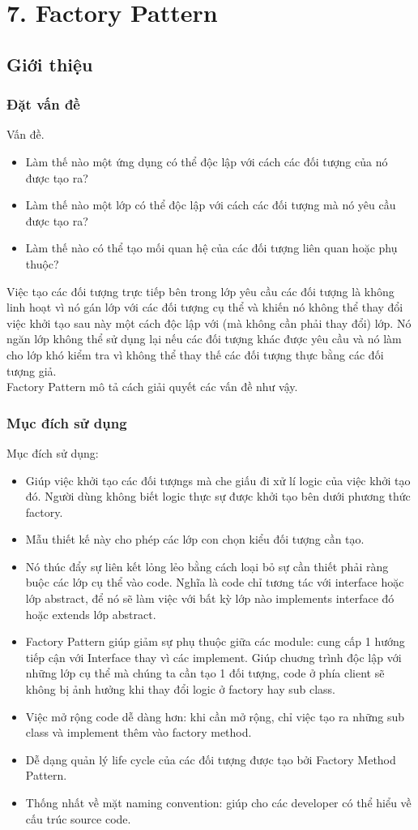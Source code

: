 \chapter{7. Factory Pattern}
\section{Giới thiệu}
\subsection{Đặt vấn đề}
Vấn đề.
\begin{itemize}
    \item Làm thế nào một ứng dụng có thể độc lập với cách các đối tượng của nó được tạo ra?
    \item Làm thế nào một lớp có thể độc lập với cách các đối tượng mà nó yêu cầu được tạo ra?
    \item Làm thế nào có thể tạo mối quan hệ của các đối tượng liên quan hoặc phụ thuộc?
\end{itemize}
Việc tạo các đối tượng trực tiếp bên trong lớp yêu cầu các đối tượng là không linh hoạt vì nó gán lớp với các đối tượng cụ thể và khiến nó không thể thay đổi việc khởi tạo sau này một cách độc lập với (mà không cần phải thay đổi) lớp. Nó ngăn lớp không thể sử dụng lại nếu các đối tượng khác được yêu cầu và nó làm cho lớp khó kiểm tra vì không thể thay thế các đối tượng thực bằng các đối tượng giả.\\
Factory Pattern mô tả cách giải quyết các vấn đề như vậy.

\subsection{Mục đích sử dụng}
Mục đích sử dụng:
\begin{itemize}
    \item Giúp việc khởi tạo các đối tượngs mà che giấu đi xử lí logic của việc khởi tạo đó. Người dùng không biết logic thực sự được khởi tạo bên dưới phương thức factory.
    \item Mẫu thiết kế này cho phép các lớp con chọn kiểu đối tượng cần tạo.
    \item Nó thúc đẩy sự liên kết lỏng lẻo bằng cách loại bỏ sự cần thiết phải ràng buộc các lớp cụ thể vào code. Nghĩa là code chỉ tương tác với interface hoặc lớp abstract, để nó sẽ làm việc với bất kỳ lớp nào implements interface đó hoặc extends lớp abstract.
    \item Factory Pattern giúp giảm sự phụ thuộc giữa các module: cung cấp 1 hướng tiếp cận với Interface thay vì các implement. Giúp chuơng trình độc lập với những lớp cụ thể mà chúng ta cần tạo 1 đối tượng, code ở phía client sẽ không bị ảnh hưởng khi thay đổi logic ở factory hay sub class.
    \item Việc mở rộng code dễ dàng hơn: khi cần mở rộng, chỉ việc tạo ra những sub class và implement thêm vào factory method.
    \item Dễ dạng quản lý life cycle của các đối tượng được tạo bởi Factory Method Pattern.
    \item Thống nhất về mặt naming convention: giúp cho các developer có thể hiểu về cấu trúc source code.
\end{itemize}

